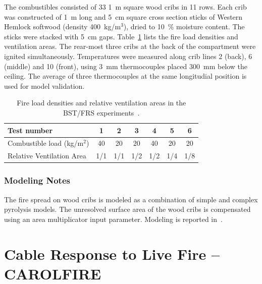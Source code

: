 The combustibles consisted of 33 1~m square wood cribs in 11 rows. Each crib was constructed of 1~m long and 5~cm square cross section sticks of Western Hemlock softwood (density 400~kg/m$^3$), dried to 10~\% moisture content. The sticks were stacked with 5~cm gaps. Table~\ref{BST_FRS_wood_cribs_tests} lists the fire load densities and ventilation areas. The rear-most three cribs at the back of the compartment were ignited simultaneously. Temperatures were measured along crib lines 2 (back), 6 (middle) and 10 (front), using 3~mm thermocouples placed 300~mm below the ceiling. The average of three thermocouples at the same longitudial position is used for model validation.

\begin{table}[ht]
\begin{center}
\caption[BST/FRS test cases]{Fire load densities and relative ventilation areas in the BST/FRS experiments~\cite{BST_FRS:1994}.}
\label{BST_FRS_wood_cribs_tests}
\begin{tabular}{|l|c|c|c|c|c|c|}
\hline
Test number                     & 1   & 2   & 3   & 4   & 5  & 6  \\ \hline \hline
Combustible load (kg/m$^2$)     & 40  & 20  & 20  & 40  & 20 & 20 \\
Relative Ventilation Area       & 1/1 & 1/1 & 1/2 & 1/2 & 1/4 & 1/8 \\ \hline
\end{tabular}
\end{center}
\end{table}

\subsubsection{Modeling Notes}

The fire spread on wood cribs is modeled as a combination of simple and complex pyrolysis models. The unresolved surface area of the wood cribs is compensated using an area multiplicator input parameter. Modeling is reported in~\cite{Janardhan:FSJ2021}.


\section{Cable Response to Live Fire -- CAROLFIRE}
\label{CAROLFIRE_Description}

